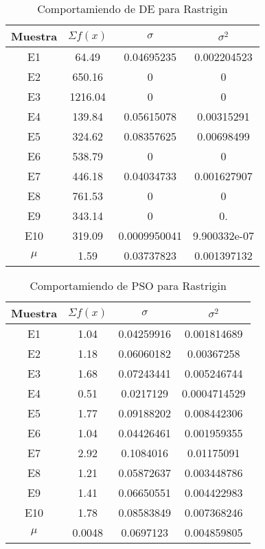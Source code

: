 \documentclass[letterpaper,12pt]{article}
\theoremstyle{definition}
\begin{document}
  \begin{table}[!h]
    \begin{center}
      \begin{tabular}{cccc}
        \toprule 
          Muestra & \(\Sigma f(x)\) & \(\sigma\)  & \(\sigma^2\)  \\
          \midrule
          \rowcolor{black!20} E1 & 64.49 & 0.04695235 & 0.002204523 \\
          E2 & 650.16 & 0 & 0 \\
          \rowcolor{black!20} E3 & 1216.04 & 0 & 0\\
          E4 & 139.84 & 0.05615078 & 0.00315291\\
          \rowcolor{black!20} E5 & 324.62 & 0.08357625 & 0.00698499 \\
          E6 & 538.79 & 0 & 0 \\
          \rowcolor{black!20} E7 & 446.18 & 0.04034733 & 0.001627907 \\
          E8 & 761.53 & 0 & 0\\
          \rowcolor{black!20} E9 & 343.14 & 0 & 0. \\
          E10 & 319.09 & 0.0009950041 & 9.900332e-07 \\
          \rowcolor{black!20} \(\mu\) & 1.59 & 0.03737823 & 0.001397132 \\ 
          \bottomrule
        \end{tabular}
    \end{center}
    \caption{Comportamiendo de DE para Rastrigin} 
\label{tab:derast}
\end{table}

\begin{table}[!h]
  \begin{center}
    \begin{tabular}{cccc}
      \toprule 
        Muestra & \(\Sigma f(x)\) & \(\sigma\)  & \(\sigma^2\)  \\
        \midrule
        \rowcolor{black!20} E1 & 1.04 & 0.04259916 & 0.001814689 \\
        E2 & 1.18 & 0.06060182 & 0.00367258 \\
        \rowcolor{black!20} E3 & 1.68 & 0.07243441 & 0.005246744\\
        E4 & 0.51 & 0.0217129 & 0.0004714529\\
        \rowcolor{black!20} E5 & 1.77 & 0.09188202& 0.008442306 \\
        E6 & 1.04 & 0.04426461 & 0.001959355 \\
        \rowcolor{black!20} E7 & 2.92 & 0.1084016 & 0.01175091 \\
        E8 & 1.21 & 0.05872637 & 0.003448786\\
        \rowcolor{black!20} E9 & 1.41 & 0.06650551 & 0.004422983 \\
        E10 & 1.78 & 0.08583849 & 0.007368246 \\
        \rowcolor{black!20} \(\mu\) & 0.0048 & 0.0697123 & 0.004859805 \\ 
        \bottomrule
      \end{tabular}
  \end{center}
  \caption{Comportamiendo de PSO para Rastrigin} 
\label{tab:psorast}
\end{table}
\end{document}
